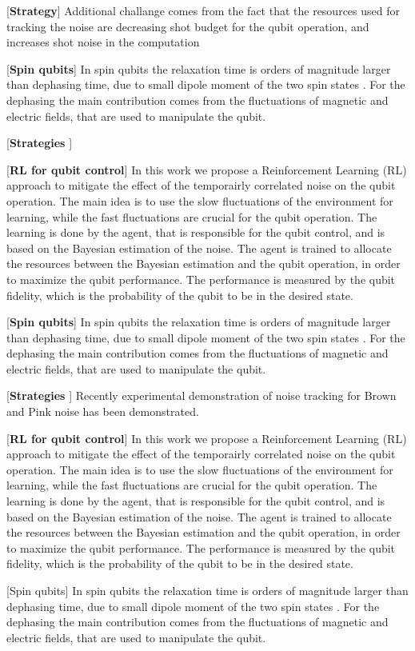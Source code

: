 \documentclass[aps,twocolumn,pra,notitlepage,]{revtex4-2}
\begin{document}
[\textbf{Strategy}]
Additional challange comes from the fact that the resources used for tracking the noise are decreasing shot budget for the qubit operation, and increases shot noise in the computation 

[\textbf{Spin qubits}] In spin qubits the relaxation time is orders of magnitude larger than dephasing time, due to small dipole moment of the two spin states \cite{}. For the dephasing the main contribution comes from the fluctuations of magnetic and electric fields, that are used to manipulate the qubit. 

[\textbf{Strategies}
]


[\textbf{RL for qubit control}] In this work we propose a Reinforcement Learning (RL) approach to mitigate the effect of the temporairly correlated noise on the qubit operation. The main idea is to use the slow fluctuations of the environment for learning, while the fast fluctuations are crucial for the qubit operation. The learning is done by the agent, that is responsible for the qubit control, and is based on the Bayesian estimation of the noise. The agent is trained to allocate the resources between the Bayesian estimation and the qubit operation, in order to maximize the qubit performance. The performance is measured by the qubit fidelity, which is the probability of the qubit to be in the desired state. 

[\textbf{Spin qubits}] In spin qubits the relaxation time is orders of magnitude larger than dephasing time, due to small dipole moment of the two spin states \cite{}. For the dephasing the main contribution comes from the fluctuations of magnetic and electric fields, that are used to manipulate the qubit. 

[\textbf{Strategies}
]
Recently experimental demonstration of noise tracking for Brown \cite{} and Pink \cite{} noise has been demonstrated. 

[\textbf{RL for qubit control}] In this work we propose a Reinforcement Learning (RL) approach to mitigate the effect of the temporairly correlated noise on the qubit operation. The main idea is to use the slow fluctuations of the environment for learning, while the fast fluctuations are crucial for the qubit operation. The learning is done by the agent, that is responsible for the qubit control, and is based on the Bayesian estimation of the noise. The agent is trained to allocate the resources between the Bayesian estimation and the qubit operation, in order to maximize the qubit performance. The performance is measured by the qubit fidelity, which is the probability of the qubit to be in the desired state. 


[Spin qubits] In spin qubits the relaxation time is orders of magnitude larger than dephasing time, due to small dipole moment of the two spin states \cite{}. For the dephasing the main contribution comes from the fluctuations of magnetic and electric fields, that are used to manipulate the qubit. 
\end{document}
